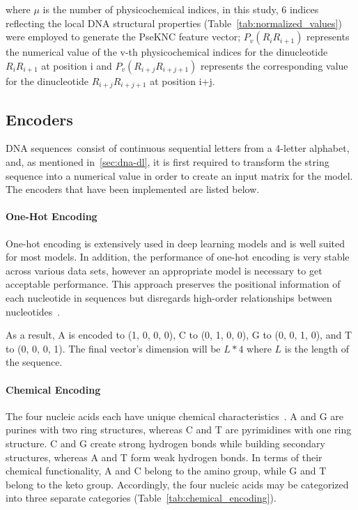 where $\mu$ is the number of physicochemical indices, in this study, 6 indices reflecting the local DNA structural properties (Table~\ref{tab:normalized_values}) were employed to generate the \gls{PseKNC} feature vector; $P_{v} (R_{i}R_{i+1})$ represents the numerical value of the v-th physicochemical indices for the dinucleotide $R_{i}R_{i+1}$ at position i and $P_{v} (R_{i+j}R_{i+j+1})$ represents the corresponding value for the dinucleotide $R_{i+j}R_{i+j+1}$ at position i+j.

\subsection{Encoders}

\gls{DNA} sequences consist of continuous sequential letters from a 4-letter alphabet, and, as mentioned in~\ref{sec:dna-dl}, it is first required to transform the string sequence into a numerical value in order to create an input matrix for the model. The encoders that have been implemented are listed below.

\paragraph{One-Hot Encoding}

One-hot encoding is extensively used in deep learning models and is well suited for most models. In addition, the performance of one-hot encoding is very stable across various data sets, however an appropriate model is necessary to get acceptable performance. This approach preserves the positional information of each nucleotide in sequences but disregards high-order relationships between nucleotides~\cite{Zhang2019ModelingNetwork}.

As a result, \gls{A} is encoded to (1, 0, 0, 0), \gls{C} to (0, 1, 0, 0), \gls{G} to (0, 0, 1, 0), and \gls{T} to (0, 0, 0, 1). The final vector's dimension will be $L * 4$ where $L$ is the length of the sequence.

\paragraph{Chemical Encoding}

The four nucleic acids each have unique chemical characteristics~\cite{GolamBari2013DNASequence}. \gls{A} and \gls{G} are purines with two ring structures, whereas \gls{C} and \gls{T} are pyrimidines with one ring structure. \gls{C} and \gls{G} create strong hydrogen bonds while building secondary structures, whereas \gls{A} and \gls{T} form weak hydrogen bonds. In terms of their chemical functionality, \gls{A} and \gls{C} belong to the amino group, while \gls{G} and \gls{T} belong to the keto group. Accordingly, the four nucleic acids may be categorized into three separate categories (Table~\ref{tab:chemical_encoding}).

